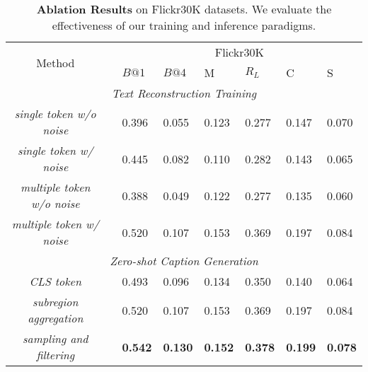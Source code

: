 \begin{table}{}{}
\small
\centering
\tabcolsep=2pt
\begin{tabular}{clllllll}
\toprule
\toprule
\multicolumn{1}{c|}{\multirow{2}{*}{Method}} &  & \multicolumn{6}{c}{Flickr30K}                    \\
\multicolumn{1}{c|}{}                        &                           & $B\texttt{@}1$   & $B\texttt{@}4$   & M     & $R_L$   & C     & S     \\ \hline
\multicolumn{8}{c}{\textit{Text Reconstruction Training}}                                                                                                      \\ \hline
\multicolumn{1}{c|}{\textit{single token w/o noise}}                &              &    0.396    & 0.055 & 0.123 &   0.277    & 0.147 & 0.070 \\
\multicolumn{1}{c|}{\textit{single token w/ noise}}                 &              &    0.445   &  0.082 & 0.110 &  0.282     & 0.143 & 0.065 \\ 
\multicolumn{1}{c|}{\textit{multiple token w/o noise}}              &              &     0.388   & 0.049 & 0.122 &  0.277     & 0.135 &  0.060 \\
\multicolumn{1}{c|}{\textit{multiple token w/ noise}}                 &              &     0.520 & 0.107 &   0.153    & 0.369 & 0.197 & 0.084  \\ \hline
\multicolumn{8}{c}{\textit{Zero-shot Caption Generation}}                                                                                                     \\ \hline
\multicolumn{1}{c|}{\textit{CLS token}}                   &                 & 0.493 & 0.096 & 0.134 & 0.350 & 0.140 & 0.064 \\
\multicolumn{1}{c|}{\textit{subregion aggregation}}                  &                 & 0.520 & 0.107 & 0.153 & 0.369 & 0.197 & 0.084 \\
\multicolumn{1}{c|}{\textit{sampling and filtering}}                   &                 & \textbf{0.542} & \textbf{0.130} & \textbf{0.152} & \textbf{0.378} &  \textbf{0.199} & \textbf{0.078} \\
\toprule
\end{tabular}
\caption{\textbf{Ablation Results} on Flickr30K datasets. We evaluate the effectiveness of our training and inference paradigms.}
\label{table:ablation}
\end{table}

